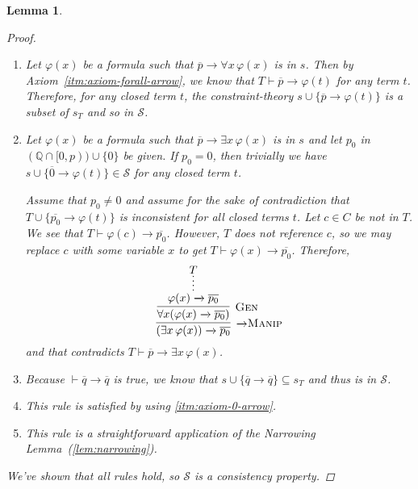 \documentclass{amsart}
\newtheorem{lemma}[theorem]{Lemma}
\theoremstyle{definition}
\numberwithin{equation}{theorem}
\renewcommand{\phi}{\varphi}
\newcommand{\Q}{\mathbb{Q}}
\newcommand{\unvee}{{\vee}}
\newcommand{\unwedge}{{\wedge}}
\newcommand{\proves}{\vdash}
\newcommand{\rat}[1]{{\overline{#1}}}
\newcommand{\narrow}[1]{\xrightarrow{#1}}
\renewcommand{\to}{\narrow{}}
\newcommand{\arr}{{\to}}
\newcommand{\intro}{\!\operatorname{I}}
\newcommand{\pushdown}{\arr\text{\sc{Manip}}}
\newcommand{\generalization}{\text{\sc{Gen}}}
\begin{document}
\begin{lemma}
\begin{proof}
\begin{enumerate}[label=(CP\arabic*)]
	    \[
	      \infer[\pushdown]{(\unvee\Phi)\to\rat{p_0}}{
	        \infer[\unwedge\intro]{\bigwedge_{\phi\in\Phi}(\phi\to\rat{p_0})}{
	          \infer*{\phi\to\rat{p_0}\text{ (for all $\phi\in\Phi$)}}{T}
	        }
	      }
	    \]
	    However, by assumption we know that $T\proves p\to(\unvee\Phi)$ and $p_0<p$, so $T$ must be inconsistent.
	    That's a contradiction, so we can pick some $\phi\in\Phi$ such that $T\cup\{\rat{p_0}\to\phi\}$ is consistent. Notice that
	    \[
	      s\cup\{\rat{p_0}\to\phi\}\subseteq s_{T\cup\{\rat{p_0}\to\phi\}},
	    \]
	    and so $s\cup\{\rat{p_0}\to\phi\}\in \mathscr{S}$.
	  \item
	    Let $\phi(x)$ be a formula such that $\rat{p}\to\forall x\,\phi(x)$ is in $s$.
	    Then by Axiom~\ref{itm:axiom-forall-arrow}, we know that $T\proves\rat{p}\to\phi(t)$ for any term $t$.
	    Therefore, for any closed term $t$, the constraint-theory $s\cup\{\rat{p}\to\phi(t)\}$ is a subset of $s_T$ and so in $\mathscr{S}$.
	  \item
	    Let $\phi(x)$ be a formula such that $\rat p\to\exists x\,\phi(x)$ is in $s$ and let $p_0$ in $(\Q\cap[0,p))\cup\{0\}$ be given.
	    If $p_0=0$, then trivially we have $s\cup\{\rat 0\to\phi(t)\}\in \mathscr{S}$ for any closed term $t$.
	    
	    Assume that $p_0\neq 0$ and assume for the sake of contradiction that $T\cup\{\rat{p_0}\to\phi(t)\}$ is inconsistent for all closed terms $t$.
	    Let $c\in C$ be not in $T$.
	    We see that $T\proves\phi(c)\to\rat{p_0}$.
	    However, $T$ does not reference $c$, so we may replace $c$ with some variable $x$ to get $T\proves\phi(x)\to\rat{p_0}$.
	    Therefore,
	    \[
	      \infer[\pushdown]{(\exists x\,\phi(x))\to\rat{p_0}}{
	        \infer[\generalization]{\forall x(\phi(x)\to\rat{p_0})}{
	          \infer*{\phi(x)\to\rat{p_0}}{T}
	        }
	      }
	    \]
	    and that contradicts $T\proves\rat p\to\exists x\,\phi(x)$.
    \item
      Because $\proves\rat q\to\rat q$ is true, we know that $s\cup\{\rat q\to\rat q\}\subseteq s_T$ and thus is in $\mathscr{S}$.
    \item This rule is satisfied by using \ref{itm:axiom-0-arrow}.
	  \item This rule is a straightforward application of the Narrowing Lemma~(\ref{lem:narrowing}).
    \end{enumerate}
    We've shown that all rules hold, so $\mathscr{S}$ is a consistency property.
  \end{proof}
\end{lemma}
\end{document}
